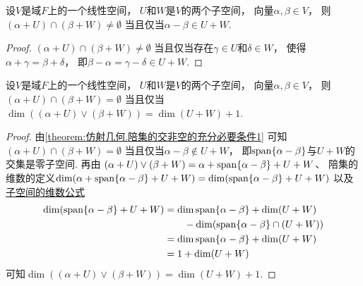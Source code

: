 \begin{theorem}\label{theorem:仿射几何.陪集的交非空的充分必要条件1}
设\(V\)是域\(F\)上的一个线性空间，
\(U\)和\(W\)是\(V\)的两个子空间，
向量\(\alpha,\beta \in V\)，
则\((\alpha + U) \cap (\beta + W) \neq \emptyset\)
当且仅当\(\alpha - \beta \in U + W\).
\begin{proof}
\((\alpha + U) \cap (\beta + W) \neq \emptyset\)
当且仅当存在\(\gamma \in U\)和\(\delta \in W\)，
使得\(\alpha + \gamma = \beta + \delta\)，
即\(\beta - \alpha = \gamma - \delta \in U + W\).
\end{proof}
\end{theorem}

\begin{theorem}\label{theorem:仿射几何.陪集的交为空的充分必要条件1}
设\(V\)是域\(F\)上的一个线性空间，
\(U\)和\(W\)是\(V\)的两个子空间，
向量\(\alpha,\beta \in V\)，
则\((\alpha + U) \cap (\beta + W) = \emptyset\)
当且仅当\(\dim((\alpha + U) \vee (\beta + W)) = \dim(U + W) + 1\).
\begin{proof}
由\cref{theorem:仿射几何.陪集的交非空的充分必要条件1} 可知
\((\alpha + U) \cap (\beta + W) = \emptyset\)
当且仅当\(\alpha - \beta \notin U + W\)，
即\(\operatorname{span}\{\alpha - \beta\}\)与\(U + W\)的交集是零子空间.
再由 \hyperref[equation:仿射几何.两个陪集的联]{\(
	(\alpha + U) \vee (\beta + W)
	= \alpha + \operatorname{span}\{\alpha - \beta\} + U + W
\)}、
陪集的维数的定义\(
	\dim(\alpha + \operatorname{span}\{\alpha - \beta\} + U + W)
	= \dim(\operatorname{span}\{\alpha - \beta\} + U + W)
\)
以及\hyperref[theorem:线性空间.子空间.子空间的维数公式]{子空间的维数公式}\begin{align*}
	\dim(\operatorname{span}\{\alpha - \beta\} + U + W)
	&= \dim\operatorname{span}\{\alpha - \beta\} + \dim(U + W) \\
	&\hspace{20pt}
		- \dim(\operatorname{span}\{\alpha - \beta\} \cap (U + W)) \\
	&= \dim\operatorname{span}\{\alpha - \beta\} + \dim(U + W) \\
	&= 1 + \dim(U + W)
\end{align*}
可知\(
	\dim((\alpha + U) \vee (\beta + W))
	= \dim(U + W) + 1
\).
\end{proof}
\end{theorem}

